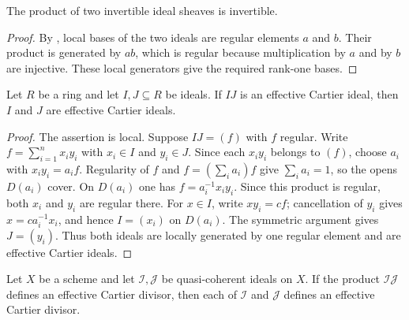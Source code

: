 \begin{lemma}
  \label{lemma:nagata-invertible-ideal-mul}

  The product of two invertible ideal sheaves is invertible.
\end{lemma}

\begin{proof}
  By , local bases of
  the two ideals are regular elements $a$ and $b$.  Their product is generated
  by $ab$, which is regular because multiplication by $a$ and by $b$ are
  injective.  These local generators give the required rank-one bases.
\end{proof}

\begin{lemma}
  \label{lemma:nagata-ideal-invertible-product-factor}

  Let $R$ be a ring and let $I,J\subseteq R$ be ideals.  If $IJ$
  is an effective Cartier ideal, then $I$ and $J$ are effective Cartier ideals.
\end{lemma}

\begin{proof}
  The assertion is local.  Suppose $IJ=(f)$ with $f$ regular.  Write
  $f=\sum_{i=1}^n x_i y_i$ with $x_i\in I$ and $y_i\in J$.  Since each
  $x_iy_i$ belongs to $(f)$, choose $a_i$ with $x_iy_i=a_if$.  Regularity of
  $f$ and $f=(\sum_i a_i)f$ give $\sum_i a_i=1$, so the opens $D(a_i)$
  cover.  On $D(a_i)$ one has
  $f=a_i^{-1}x_i y_i$.  Since this product is regular, both $x_i$ and $y_i$
  are regular there.  For $x\in I$, write $xy_i=cf$; cancellation of $y_i$
  gives $x=ca_i^{-1}x_i$, and hence $I=(x_i)$ on $D(a_i)$.  The symmetric
  argument gives $J=(y_i)$.  Thus both ideals are locally generated by one
  regular element and are effective Cartier ideals.
\end{proof}

\begin{lemma}
  \label{lemma:nagata-invertible-product-factor}

  Let $X$ be a scheme and let $\mathcal I,\mathcal J$ be quasi-coherent
  ideals on $X$.  If the product
  $\mathcal I\mathcal J$ defines an effective Cartier divisor, then each of
  $\mathcal I$ and $\mathcal J$ defines an effective Cartier divisor.
\end{lemma}

